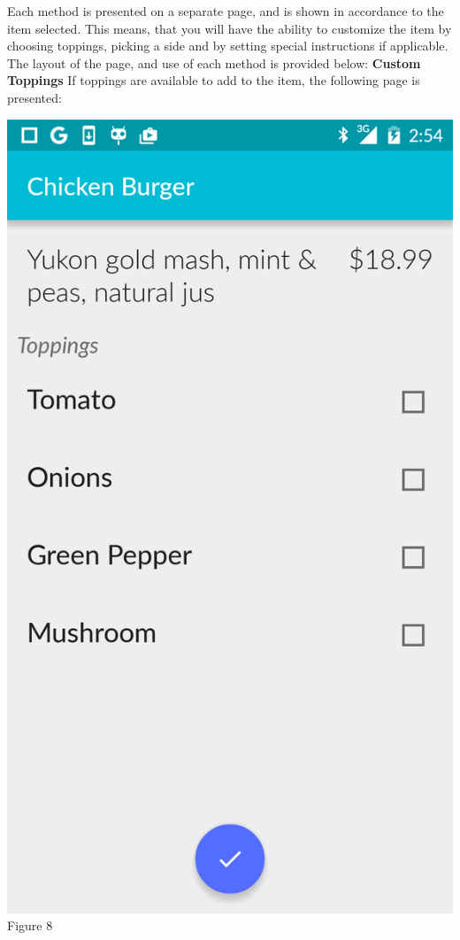 \documentclass[12pt, titlepage]{article}
\begin{document}
\noindent  Each method is presented on a separate page, and is shown in accordance to the item selected. This means, that you will have the ability to customize the item by choosing toppings, picking a side and by setting special instructions if applicable. 
\newline \newline
The layout of the page, and use of each method is provided below: \pagebreak\newline
\textbf{Custom Toppings} \newline
If toppings are available to add to the item, the following page is presented:
\begin{center}\includegraphics[scale=0.15]{toppings.png}	\linebreak Figure 8 \end{center}
\end{document}
